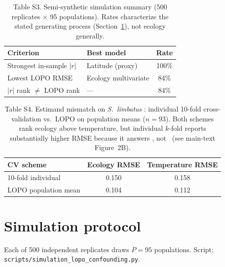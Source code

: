 \documentclass[11pt]{article}
\begin{document}
\begin{table}[h]
  \caption{Table S3. Semi-synthetic simulation summary (500 replicates
    $\times$ 95 populations).  Rates characterize the stated generating
    process (Section~\ref{sec:sim-protocol}), not ecology generally.}
  \label{tab:esm-simulation}
  \begin{center}
  \begin{tabular}{llc}
    \toprule
    Criterion & Best model & Rate \\
    \midrule
    Strongest in-sample $|r|$ & Latitude (proxy) & 100\% \\
    Lowest LOPO RMSE & Ecology multivariate & 84\% \\
    $|r|$ rank $\neq$ LOPO rank & --- & 84\% \\
    \bottomrule
  \end{tabular}
  \end{center}
\end{table}

\begin{table}[h]
  \caption{Table S4. Estimand mismatch on \emph{S.\ limbatus}
    \citep{stillwell2007}: individual 10-fold cross-validation vs.\ LOPO on
    population means ($n=93$).  Both schemes rank ecology above temperature,
    but individual $k$-fold reports substantially higher RMSE because it
    answers \Eone, not \Etwo\ (see main-text Figure~2B).}
  \label{tab:esm-cv-unit}
  \begin{center}
  \begin{tabular}{lcc}
    \toprule
    CV scheme & Ecology RMSE & Temperature RMSE \\
    \midrule
    10-fold individual & 0.150 & 0.158 \\
    LOPO population mean & 0.104 & 0.112 \\
    \bottomrule
  \end{tabular}
  \end{center}
\end{table}

\section{Simulation protocol}
\label{sec:sim-protocol}

Each of 500 independent replicates draws $P=95$ populations.  Script:
\texttt{scripts/simulation\_lopo\_confounding.py}.
\end{document}

